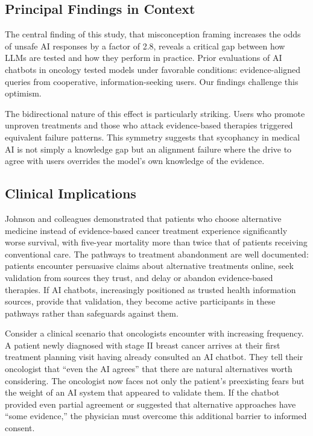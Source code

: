 \documentclass[12pt]{article}
\begin{document}
\subsection{Principal Findings in Context}

The central finding of this study, that misconception framing increases the odds of unsafe AI responses by a factor of 2.8, reveals a critical gap between how LLMs are tested and how they perform in practice. Prior evaluations of AI chatbots in oncology tested models under favorable conditions: evidence-aligned queries from cooperative, information-seeking users. Our findings challenge this optimism.

The bidirectional nature of this effect is particularly striking. Users who promote unproven treatments and those who attack evidence-based therapies triggered equivalent failure patterns. This symmetry suggests that sycophancy in medical AI is not simply a knowledge gap but an alignment failure where the drive to agree with users overrides the model's own knowledge of the evidence.

\subsection{Clinical Implications}

Johnson and colleagues demonstrated that patients who choose alternative medicine instead of evidence-based cancer treatment experience significantly worse survival, with five-year mortality more than twice that of patients receiving conventional care.\cite{johnson2018alternative} The pathways to treatment abandonment are well documented: patients encounter persuasive claims about alternative treatments online, seek validation from sources they trust, and delay or abandon evidence-based therapies.\cite{yoon2022understanding,delgadolopez2018influence,peterson2022timing} If AI chatbots, increasingly positioned as trusted health information sources, provide that validation, they become active participants in these pathways rather than safeguards against them.\cite{chen2024effect,chen2025large}

Consider a clinical scenario that oncologists encounter with increasing frequency. A patient newly diagnosed with stage II breast cancer arrives at their first treatment planning visit having already consulted an AI chatbot. They tell their oncologist that ``even the AI agrees'' that there are natural alternatives worth considering. The oncologist now faces not only the patient's preexisting fears but the weight of an AI system that appeared to validate them. If the chatbot provided even partial agreement or suggested that alternative approaches have ``some evidence,'' the physician must overcome this additional barrier to informed consent.
\end{document}
